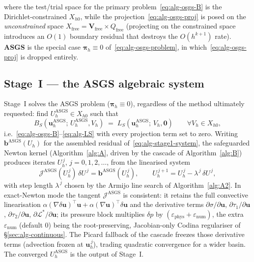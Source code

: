 \documentclass{article}
\begin{document}
where the test/trial space for the primary problem~\eqref{eq:alg-osgs-B}
is the Dirichlet-constrained $X_{h0}$, while the projection~\eqref{eq:alg-osgs-proj}
is posed on the \emph{unconstrained} space $X_{\mathrm{free}} =
\boldsymbol{V}_{\mathrm{free}}\times Q_{\mathrm{free}}$ (projecting on the
constrained space introduces an $O(1)$ boundary residual that destroys the
$O(h^{k+1})$ rate). \textbf{ASGS} is the special case $\boldsymbol{\pi}_h
\equiv 0$ of~\eqref{eq:alg-osgs-problem}, in which~\eqref{eq:alg-osgs-proj}
is dropped entirely.

\subsection{Stage~I --- the ASGS algebraic system}
\label{sec:alg-stage1}

Stage~I solves the ASGS problem ($\boldsymbol{\pi}_h \equiv 0$),
regardless of the method ultimately requested: find $U_h^{\mathrm{ASGS}}
\in X_{h0}$ such that
\begin{equation}
    \label{eq:alg-stage1-system}
    B_S(\boldsymbol{u}_h^{\mathrm{ASGS}};\, U_h^{\mathrm{ASGS}}, V_h)
        \;=\; L_S(\boldsymbol{u}_h^{\mathrm{ASGS}};\, V_h, \boldsymbol{0})
        \qquad \forall V_h \in X_{h0},
\end{equation}
i.e.~\eqref{eq:alg-osgs-B}--\eqref{eq:alg-LS} with every projection term
set to zero. Writing $\boldsymbol{b}^{\mathrm{ASGS}}(U_h)$ for the
assembled residual of~\eqref{eq:alg-stage1-system}, the safeguarded
Newton kernel (Algorithm~\ref{alg:A}, driven by the cascade of
Algorithm~\ref{alg:B}) produces iterates $U_h^{\,j}$, $j = 0,1,2,\dots$,
from the linearised system
\begin{equation}
    \label{eq:alg-stage1-newton}
    \mathcal{J}^{\mathrm{ASGS}}(U_h^{\,j})\,\delta U^{\,j}
        = \boldsymbol{b}^{\mathrm{ASGS}}(U_h^{\,j}),
    \qquad
    U_h^{\,j+1} = U_h^{\,j} - \lambda^{\,j}\,\delta U^{\,j},
\end{equation}
with step length $\lambda^{\,j}$ chosen by the Armijo line search of
Algorithm~\ref{alg:A2}. In exact-Newton mode the tangent
$\mathcal{J}^{\mathrm{ASGS}}$ is consistent: it retains the full
convective linearisation $\alpha(\nabla\delta\boldsymbol{u})^{\!\top}\!\boldsymbol{u}
+ \alpha(\nabla\boldsymbol{u})^{\!\top}\!\delta\boldsymbol{u}$ and the
derivative terms $\partial\sigma/\partial\boldsymbol{u}$,
$\partial\tau_1/\partial\boldsymbol{u}$, $\partial\tau_2/\partial\boldsymbol{u}$,
$\partial\mathcal{L}^{*}/\partial\boldsymbol{u}$; its pressure block
multiplies $\delta p$ by $(\varepsilon_{\mathrm{phys}}+\varepsilon_{\mathrm{num}})$,
the extra $\varepsilon_{\mathrm{num}}$ (default $0$) being the root-preserving,
Jacobian-only Codina regulariser of §\ref{sec:alg-continuous}. The Picard fallback of
the cascade freezes those derivative terms (advection frozen at
$\boldsymbol{u}_h^{\,j}$), trading quadratic convergence for a wider basin.
The converged $U_h^{\mathrm{ASGS}}$ is the output of Stage~I.
\end{document}
